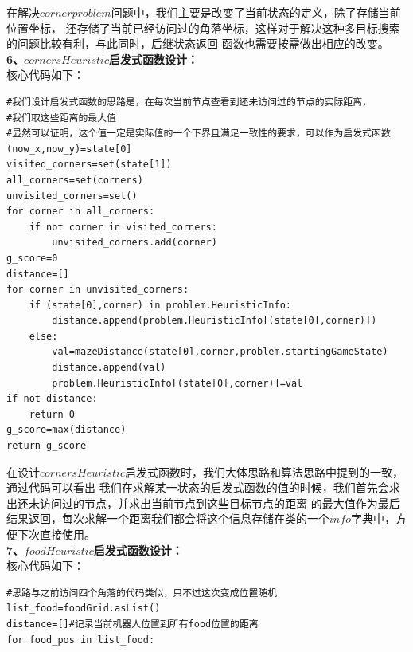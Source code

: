 \documentclass[a4paper,12pt,UTF8]{article}
\begin{document}
\begin{flushleft}
{{    }
    \normalsize{
        \hspace{1cm}在解决$cornerproblem$问题中，我们主要是改变了当前状态的定义，除了存储当前位置坐标，
        还存储了当前已经访问过的角落坐标，这样对于解决这种多目标搜索的问题比较有利，与此同时，后继状态返回
        函数也需要按需做出相应的改变。\\
    }
    \large{
        \hspace{1cm}\textbf{6、$cornersHeuristic$启发式函数设计：\\}
    }
    \normalsize{
        \hspace{1cm}核心代码如下：\\
    }
    \scriptsize{
        \begin{lstlisting}
#我们设计启发式函数的思路是，在每次当前节点查看到还未访问过的节点的实际距离，
#我们取这些距离的最大值
#显然可以证明，这个值一定是实际值的一个下界且满足一致性的要求，可以作为启发式函数
(now_x,now_y)=state[0]
visited_corners=set(state[1])
all_corners=set(corners)
unvisited_corners=set()
for corner in all_corners:
    if not corner in visited_corners:
        unvisited_corners.add(corner)
g_score=0
distance=[]
for corner in unvisited_corners:
    if (state[0],corner) in problem.HeuristicInfo:
        distance.append(problem.HeuristicInfo[(state[0],corner)])
    else:
        val=mazeDistance(state[0],corner,problem.startingGameState)
        distance.append(val)
        problem.HeuristicInfo[(state[0],corner)]=val
if not distance:
    return 0
g_score=max(distance)
return g_score
        \end{lstlisting}
    }
    \normalsize{
        \hspace{1cm}在设计$cornersHeuristic$启发式函数时，我们大体思路和算法思路中提到的一致，通过代码可以看出
        我们在求解某一状态的启发式函数的值的时候，我们首先会求出还未访问过的节点，并求出当前节点到这些目标节点的距离
        的最大值作为最后结果返回，每次求解一个距离我们都会将这个信息存储在类的一个$info$字典中，方便下次直接使用。\\
    }
    \large{
        \hspace{1cm}\textbf{7、$foodHeuristic$启发式函数设计：\\}
    }
    \normalsize{
        \hspace{1cm}核心代码如下：\\
    }
    \scriptsize{
        \begin{lstlisting}
#思路与之前访问四个角落的代码类似，只不过这次变成位置随机
list_food=foodGrid.asList()
distance=[]#记录当前机器人位置到所有food位置的距离
for food_pos in list_food:

\end{lstlisting}}}
\end{flushleft}
\end{document}
